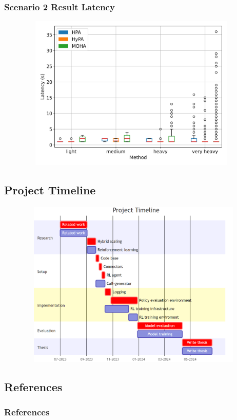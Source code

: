 \documentclass[11pt,t,usepdftitle=false,aspectratio=169]{beamer}
\begin{document}
\begin{frame}
	\frametitle{Scenario 2 Result Latency}
	\begin{figure}
		\centering
		\vspace*{-0.5cm}
		\includegraphics[width=11cm,height=7.4cm]{_images/scenario_2/latency_stacked.png}
	\end{figure}
\end{frame}

\subsection{Project Timeline}
\begin{frame}
	\begin{figure}
		\centering
		\vspace*{-0.2cm}
		\includegraphics[width=13cm,height=8cm]{_images/milestones.png}
	\end{figure}
\end{frame}


\subsection{References}
\begin{frame}[allowframebreaks]
	\frametitle{References}
	
	\nocite{bib_uibk_latex}
	
	
	
\end{frame}
\end{document}
